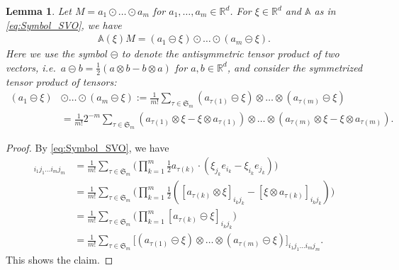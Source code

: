 \documentclass[a4paper, 10pt, twoside, notitlepage]{amsart}
\theoremstyle{plain}
\newtheorem{lem}[prop]{Lemma}
\newcommand{\R}{\mathbb{R}}
\renewcommand{\AA}{\mathbb{A}}
\begin{document}
		\begin{lem}\label{lem:SVsymb}
			Let $M = a_1 \odot \dots \odot a_m$ for $a_1,\dots,a_m \in \R^d$.  For $\xi \in \R^d$ and $\AA$ as in \cref{eq:Symbol_SVO}, we have
			\begin{align} \label{eq:AlternativeSymbol}
                          \AA(\xi)M = (a_1 \circleddash \xi) \odot \dots \odot (a_m \circleddash \xi).
			\end{align}
			Here we use the symbol $\circleddash$ to denote the antisymmetric tensor product of two vectors, i.e.~$a \circleddash b = \frac{1}{2}( a \otimes b - b \otimes a)$ for $a,b \in \R^d$, and consider the symmetrized tensor product of tensors:
                          \begin{align*}
                            (a_1 \circleddash \xi) & \odot \dots \odot (a_m \circleddash \xi) := \frac{1}{m!} \sum_{\tau \in \mathfrak{S}_m} (a_{\tau(1)} \circleddash \xi) \otimes \dots \otimes (a_{\tau(m)} \circleddash \xi) \\
                            & = \frac{1}{m!} 2^{-m} \sum_{\tau \in \mathfrak{S}_m} (a_{\tau(1)} \otimes \xi - \xi \otimes a_{\tau(1)}) \otimes \dots \otimes (a_{\tau(m)} \otimes \xi - \xi \otimes a_{\tau(m)}).
                        \end{align*}
                        

		\end{lem}
		
		\begin{proof}
			By \cref{eq:Symbol_SVO}, we have
			\begin{align*}
				[\AA(\xi)M]_{i_1j_1\dots i_m j_m} & = \frac{1}{m!} \sum_{\tau \in \mathfrak{S}_m} \Big( \prod_{k=1}^m \frac{1}{2} a_{\tau(k)}\cdot (\xi_{j_k} e_{i_k} - \xi_{i_k} e_{j_k}) \Big) \\
				&= \frac{1}{m!} \sum_{\tau \in \mathfrak{S}_m} \Big( \prod_{k=1}^m \frac{1}{2} ([a_{\tau(k)} \otimes \xi]_{i_k j_k} - [\xi \otimes a_{\tau(k)}]_{i_k j_k} ) \Big) \\
				& = \frac{1}{m!} \sum_{\tau \in \mathfrak{S}_m} \Big( \prod_{k=1}^m [a_{\tau(k)} \circleddash \xi]_{i_k j_k} \Big) \\
				&= \frac{1}{m!} \sum_{\tau \in
					\mathfrak{S}_m} \Big[ (a_{\tau(1)} \circleddash \xi) \otimes \dots \otimes (a_{\tau(m)} \circleddash \xi) \Big]_{i_1 j_1 \dots i_m j_m}.
			\end{align*}
			This shows the claim.
		\end{proof}
		          
\end{document}
